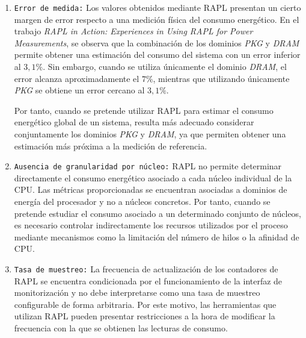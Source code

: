 \begin{enumerate}
     También pueden aparecer problemas cuando se ejecutan procesos de forma consecutiva con un intervalo de tiempo muy reducido entre ellos. En este escenario, la diferencia entre las lecturas realizadas antes y después de cada ejecución puede verse afectada por el intervalo de muestreo y por el funcionamiento del propio sistema.
  
     En este sentido, se ha observado que es necesario establecer un intervalo mínimo entre ejecuciones consecutivas para determinados dominios de RAPL. Para el grupo \textit{DRAM} junto con \textit{PKG}, se recomienda dejar un intervalo de entre $4,4$ y $5,2$ ms antes de iniciar un nuevo proceso. De forma similar, para el grupo \textit{PP0} junto con \textit{PKG}, el intervalo recomendado se sitúa entre $2,8$ y $3,6$ ms.
  
     \item \texttt{Error de medida:} Los valores obtenidos mediante RAPL presentan un cierto margen de error respecto a una medición física del consumo energético. En el trabajo \textit{RAPL in Action: Experiences in Using RAPL for Power Measurements}, se observa que la combinación de los dominios \textit{PKG} y \textit{DRAM} permite obtener una estimación del consumo del sistema con un error inferior al $3,1\%$. Sin embargo, cuando se utiliza únicamente el dominio \textit{DRAM}, el error alcanza aproximadamente el $7\%$, mientras que utilizando únicamente \textit{PKG} se obtiene un error cercano al $3,1\%$.
  
     Por tanto, cuando se pretende utilizar RAPL para estimar el consumo energético global de un sistema, resulta más adecuado considerar conjuntamente los dominios \textit{PKG} y \textit{DRAM}, ya que permiten obtener una estimación más próxima a la medición de referencia.
  
     \item \texttt{Ausencia de granularidad por núcleo:} RAPL no permite determinar directamente el consumo energético asociado a cada núcleo individual de la CPU. Las métricas proporcionadas se encuentran asociadas a dominios de energía del procesador y no a núcleos concretos. Por tanto, cuando se pretende estudiar el consumo asociado a un determinado conjunto de núcleos, es necesario controlar indirectamente los recursos utilizados por el proceso mediante mecanismos como la limitación del número de hilos o la afinidad de CPU.
  
     \item \texttt{Tasa de muestreo:} La frecuencia de actualización de los contadores de RAPL se encuentra condicionada por el funcionamiento de la interfaz de monitorización y no debe interpretarse como una tasa de muestreo configurable de forma arbitraria. Por este motivo, las herramientas que utilizan RAPL pueden presentar restricciones a la hora de modificar la frecuencia con la que se obtienen las lecturas de consumo.
  
  \end{enumerate}

